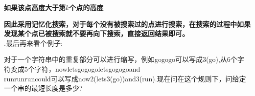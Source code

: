 \documentclass[a4paper,10pt]{article}
\begin{document}
\begin{CJK}{UTF8}{gbsn}
\begin{center}
\par
\textbf{如果该点高度大于第$k$个点的高度}
\end{center}
\textbf{因此采用记忆化搜索，对于每个没有被搜索过的点进行搜索，在搜索的过程中如果发现某个点已被搜索就不要再向下搜索，直接返回结果即可。}\newline\\
.最后再来看个例子: \begin{CJK}{UTF8}{gkai}对于一个字符串中的重复部分可以进行缩写，例如gogogo可以写成3(go),从6个字符变成5个字符，nowletsgogogoletsgogogoand\\runrunruncould可以写成now2(lets3(go))and3(run).现在问在这个规则下，问给定一个串的最短长度是多少?\end{CJK}
\end{CJK}
\end{document}
